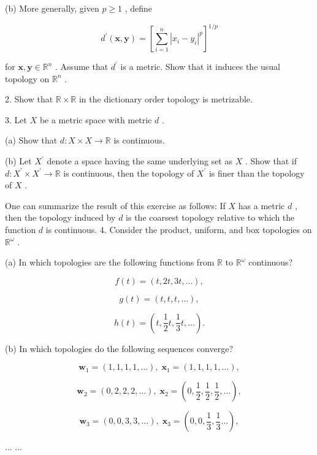(b) More generally, given \(p \geq  1\) , define

\[
{d}^{\prime }\left( {\mathbf{x},\mathbf{y}}\right)  = {\left\lbrack  \mathop{\sum }\limits_{{i = 1}}^{n}{\left| {x}_{i} - {y}_{i}\right| }^{p}\right\rbrack  }^{1/p}
\]

for \(\mathbf{x},\mathbf{y} \in  {\mathbb{R}}^{n}\) . Assume that \({d}^{\prime }\) is a metric. Show that it induces the usual topology on \({\mathbb{R}}^{n}\) .

2. Show that \(\mathbb{R} \times  \mathbb{R}\) in the dictionary order topology is metrizable.

3. Let \(X\) be a metric space with metric \(d\) .

(a) Show that \(d : X \times  X \rightarrow  \mathbb{R}\) is continuous.

(b) Let \({X}^{\prime }\) denote a space having the same underlying set as \(X\) . Show that if \(d : {X}^{\prime } \times  {X}^{\prime } \rightarrow  \mathbb{R}\) is continuous, then the topology of \({X}^{\prime }\) is finer than the topology of \(X\) .

One can summarize the result of this exercise as follows: If \(X\) has a metric \(d\) , then the topology induced by \(d\) is the coarsest topology relative to which the function \(d\) is continuous. 4. Consider the product, uniform, and box topologies on \({\mathbb{R}}^{\omega }\) .

(a) In which topologies are the following functions from \(\mathbb{R}\) to \({\mathbb{R}}^{\omega }\) continuous?

\[
f\left( t\right)  = \left( {t,{2t},{3t},\ldots }\right) ,
\]

\[
g\left( t\right)  = \left( {t,t,t,\ldots }\right) ,
\]

\[
h\left( t\right)  = \left( {t,\frac{1}{2}t,\frac{1}{3}t,\ldots }\right) .
\]

(b) In which topologies do the following sequences converge?

\[
{\mathbf{w}}_{1} = \left( {1,1,1,1,\ldots }\right) ,\;{\mathbf{x}}_{1} = \left( {1,1,1,1,\ldots }\right) ,
\]

\[
{\mathbf{w}}_{2} = \left( {0,2,2,2,\ldots }\right) ,\;{\mathbf{x}}_{2} = \left( {0,\frac{1}{2},\frac{1}{2},\frac{1}{2},\ldots }\right) ,
\]

\[
{\mathbf{w}}_{3} = \left( {0,0,3,3,\ldots }\right) ,\;{\mathbf{x}}_{3} = \left( {0,0,\frac{1}{3},\frac{1}{3}\ldots }\right) ,
\]

... ...

